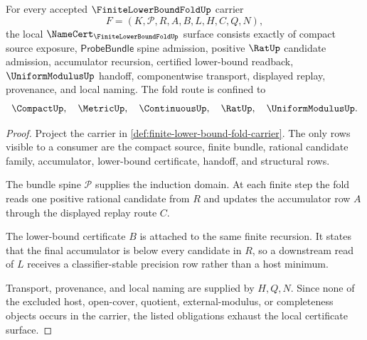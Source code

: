 \begin{theorem}
\label{thm:finite-lower-bound-fold-namecert-obligations}
For every accepted $\FiniteLowerBoundFoldUp$ carrier
$$
F=(K,\mathcal{P},R,A,B,L,H,C,Q,N),
$$
the local $\NameCert_{\FiniteLowerBoundFoldUp}$ surface consists exactly of compact source exposure, $\mathsf{ProbeBundle}$ spine admission, positive $\RatUp$ candidate admission, accumulator recursion, certified lower-bound readback, $\UniformModulusUp$ handoff, componentwise transport, displayed replay, provenance, and local naming. The fold route is confined to
$$
\CompactUp,\quad \MetricUp,\quad \ContinuousUp,\quad \RatUp,\quad \UniformModulusUp .
$$
\end{theorem}
\begin{proof}
Project the carrier in \autoref{def:finite-lower-bound-fold-carrier}. The only rows visible to a consumer are the compact source, finite bundle, rational candidate family, accumulator, lower-bound certificate, handoff, and structural rows.

The bundle spine $\mathcal{P}$ supplies the induction domain. At each finite step the fold reads one positive rational candidate from $R$ and updates the accumulator row $A$ through the displayed replay route $C$.

The lower-bound certificate $B$ is attached to the same finite recursion. It states that the final accumulator is below every candidate in $R$, so a downstream read of $L$ receives a classifier-stable precision row rather than a host minimum.

Transport, provenance, and local naming are supplied by $H,Q,N$. Since none of the excluded host, open-cover, quotient, external-modulus, or completeness objects occurs in the carrier, the listed obligations exhaust the local certificate surface.
\end{proof}

